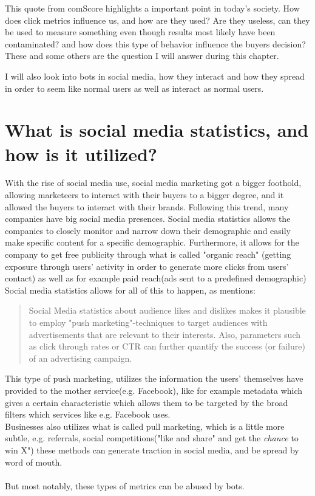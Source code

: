 This quote from comScore highlights a important point in today's society. How does click metrics influence us, and how are they used? Are they useless, can they be used to measure something even though results most likely have been contaminated? and how does this type of behavior influence the buyers decision? These and some others are the question I will answer during this chapter. 

I will also look into bots in social media, how they interact and how they spread in order to seem like normal users as well as interact as normal users. 
\section{What is  social media statistics, and how is it utilized?}
With the rise of social media use, social media marketing got a bigger foothold, allowing marketeers to interact with their buyers to a bigger degree, and it allowed the buyers to interact with their brands. Following this trend, many companies have big social media presences. Social media statistics allows the companies to closely monitor and narrow down their demographic and easily make specific content for a specific demographic. Furthermore, it allows for the company to get free publicity through what is called "organic reach" (getting exposure through users' activity in order to generate more clicks from users' contact) as well as for example paid reach(ads sent to a predefined demographic)
Social media statistics allows for all of this to happen, as \cite{Singh2013} mentions:
\begin{quotation}
Social Media statistics about audience likes and dislikes makes it plausible to employ "push marketing"-techniques to target audiences with advertisements that are relevant to their interests. Also, parameters such as click through rates or CTR can further quantify the success (or failure) of an advertising campaign. 
\end{quotation}
This type of push marketing, utilizes the information the users' themselves have provided to the mother service(e.g. Facebook), like for example metadata which gives a certain characteristic which allows them to be targeted by the broad filters which services like e.g. Facebook uses. 
\\
Businesses also utilizes what is called pull marketing, which is a little more subtle, e.g. referrals, social competitions("like and share" and get the \textit{chance} to win X") these methods can generate traction in social media, and be spread by word of mouth. 
\\
\\
But most notably, these types of metrics can be abused by bots.

